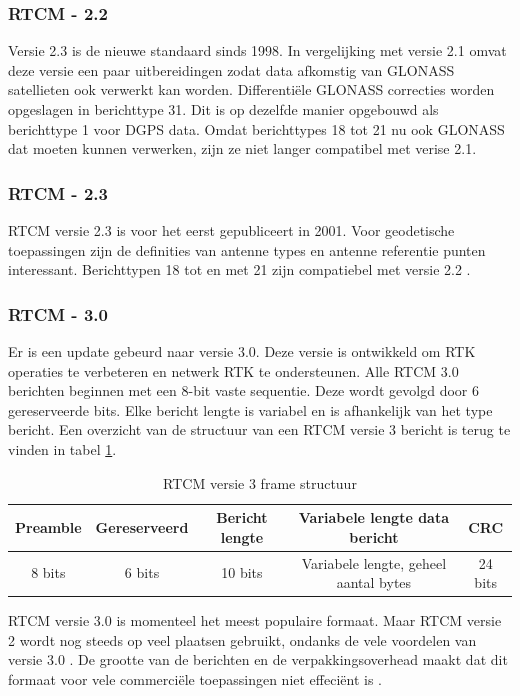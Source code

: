 \subsubsection{RTCM - 2.2}
Versie 2.3 is de nieuwe standaard sinds 1998. In vergelijking met versie 2.1 omvat deze versie een paar uitbereidingen zodat data afkomstig van GLONASS satellieten ook verwerkt kan worden. Differenti\"ele GLONASS correcties worden opgeslagen in berichttype 31. Dit is op dezelfde manier opgebouwd als berichttype 1 voor DGPS data. Omdat berichttypes 18 tot 21 nu ook GLONASS dat moeten kunnen verwerken, zijn ze niet langer compatibel met verise 2.1. 

\subsubsection{RTCM - 2.3}
RTCM versie 2.3 is voor het eerst gepubliceert in 2001.  Voor geodetische toepassingen zijn de definities van antenne types en antenne referentie punten interessant. Berichttypen 18 tot en met 21 zijn compatiebel met versie 2.2 \cite{LBibRTCM3}. 

\subsubsection{RTCM - 3.0}
 Er is een update gebeurd naar versie 3.0. Deze versie is ontwikkeld om RTK operaties te verbeteren en netwerk RTK te ondersteunen. Alle RTCM 3.0 berichten beginnen met een 8-bit vaste sequentie. Deze wordt gevolgd door 6 gereserveerde bits. Elke bericht lengte is variabel en is afhankelijk van het type bericht. Een overzicht van de structuur van een RTCM versie 3 bericht is terug te vinden in tabel \ref{TabRTCM}.

\begin{table}[hbp]
	\caption{RTCM versie 3 frame structuur}		
	\begin{tabular}{|c|c|c|c|c|}	
		\hline
		Preamble & Gereserveerd & Bericht lengte & Variabele lengte data bericht & CRC \\ \hline
		8 bits & 6 bits & 10 bits & Variabele lengte, geheel aantal bytes & 24 bits \\ \hline
	\end{tabular}
	\label{TabRTCM}
\end{table}
RTCM versie 3.0 is momenteel het meest populaire formaat. Maar RTCM versie 2 wordt nog steeds op veel plaatsen gebruikt, ondanks de vele voordelen van versie 3.0 \cite{LBibRTCM}. De grootte van de berichten en de verpakkingsoverhead maakt dat dit formaat voor vele commerci\"ele toepassingen niet effeci\"ent is \cite{LBibDGPS}.  

